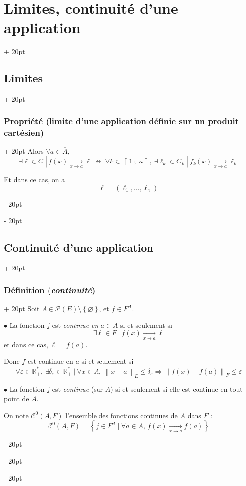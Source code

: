 \documentclass[a4paper, 12pt, twoside]{article}
\newcommand{\R}{\mathbb{R}} %
\newcommand{\nset}[2]{\left\llbracket #1\ ;\ #2 \right\rrbracket}
\newcommand{\cj}[1]{\overline{#1}} %
\newcommand{\tendsto}[1]{\xrightarrow[#1]{}}
\newcommand{\set}[1]{\left\{ #1 \right\}}
\newcommand{\norm}[1]{\left\lVert #1 \right\rVert}
\newcommand{\ssi}{\ \Leftrightarrow \ }
\renewcommand{\le}{\leqslant}
\newcommand{\ind}[1][20pt]{\advance\leftskip + #1}
\newcommand{\deind}[1][20pt]{\advance\leftskip - #1}
\newenvironment{indt}[2][20pt]{#2 \par \ind[#1]}{\par \deind} %
\begin{document}
\begin{indt}{\section{Limites, continuité d'une application}}
\begin{indt}{\subsection{Limites}}
\begin{indt}{\subsubsection{Propriété (limite d'une application définie sur un produit cartésien)}}
                Alors $\forall a \in \cj A$,
                \[
                    \exists \ell \in G\ |\ f(x) \tendsto{x \to a} \ell
                    \ssi
                    \forall k \in \nset 1 n,\ \exists \ell_k \in G_k\ |\ f_k(x) \tendsto{x \to a} \ell_k
                \]

                Et dans ce cas, on a
                \[
                    \ell = (\ell_1, \ldots, \ell_n)
                \]
            \end{indt}
        \end{indt}

        \vspace{12pt}
        
        \begin{indt}{\subsection{Continuité d'une application}}
            \begin{indt}{\subsubsection{Définition (\textit{continuité})}}
                Soit $A \in \mathcal P(E) \setminus \set \varnothing$, et $f \in F^A$.

                \vspace{6pt}
                
                $\bullet$ La fonction $f$ est \emph{continue en $a \in A$} si et seulement si
                \[
                    \exists \ell \in F\ |\ f(x) \tendsto{x \to a} \ell
                \]
                et dans ce cas, $\ell = f(a)$.

                Donc $f$ est continue en $a$ si et seulement si
                \[
                    \forall \varepsilon \in \R^*_+,\
                    \exists \delta_\varepsilon \in \R^*_+\ |\
                    \forall x \in A,\
                    \norm{x - a}_E \le \delta_\varepsilon \Rightarrow \norm{f(x) - f(a)}_F \le \varepsilon
                \]

                \vspace{6pt}
                
                $\bullet$ La fonction $f$ est \emph{continue} (sur $A$) si et seulement si elle est continue en tout point de $A$.

                On note $\mathcal C^0(A, F)$ l'ensemble des fonctions continues de $A$ dans $F$ :
                \[
                    \mathcal C^0(A, F) = \set{f \in F^A\ |\ \forall a \in A,\ f(x) \tendsto{x \to a} f(a)}
                \]
            \end{indt}


\end{indt}
\end{indt}
\end{document}
